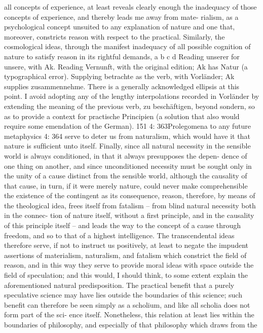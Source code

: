 all concepts of experience, at least reveals clearly enough the inadequacy
of those concepts of experience, and thereby leads me away from mate-
rialism, as a psychological concept unsuited to any explanation of nature
and one that, moreover, constricts reason with respect to the practical.
Similarly, the cosmological ideas, through the manifest inadequacy of all
possible cognition of nature to satisfy reason in its rightful demands,
a
b
c
d
Reading unserer for unsere, with Ak.
Reading Vernunft, with the original edition; Ak has Natur (a typographical error).
Supplying betrachte as the verb, with Vorländer; Ak supplies zusammennehme.
There is a generally acknowledged ellipsis at this point. I avoid adopting any of the
lengthy interpolations recorded in Vorländer by extending the meaning of the previous
verb, zu beschäftigen, beyond sondern, so as to provide a context for practische Principien (a
solution that also would require some emendation of the German).
151
4: 363Prolegomena to any future metaphysics
4: 364
serve to deter us from naturalism, which would have it that nature is
sufﬁcient unto itself. Finally, since all natural necessity in the sensible
world is always conditioned, in that it always presupposes the depen-
dence of one thing on another, and since unconditioned necessity must
be sought only in the unity of a cause distinct from the sensible world,
although the causality of that cause, in turn, if it were merely nature,
could never make comprehensible the existence of the contingent as its
consequence, reason, therefore, by means of the theological idea, frees
itself from fatalism – from blind natural necessity both in the connec-
tion of nature itself, without a ﬁrst principle, and in the causality of this
principle itself – and leads the way to the concept of a cause through
freedom, and so to that of a highest intelligence. The transcendental
ideas therefore serve, if not to instruct us positively, at least to negate
the impudent assertions of materialism, naturalism, and fatalism which
constrict the ﬁeld of reason, and in this way they serve to provide moral
ideas with space outside the ﬁeld of speculation; and this would, I should
think, to some extent explain the aforementioned natural predisposition.
The practical beneﬁt that a purely speculative science may have lies
outside the boundaries of this science; such beneﬁt can therefore be seen
simply as a scholium, and like all scholia does not form part of the sci-
ence itself. Nonetheless, this relation at least lies within the boundaries
of philosophy, and especially of that philosophy which draws from the
